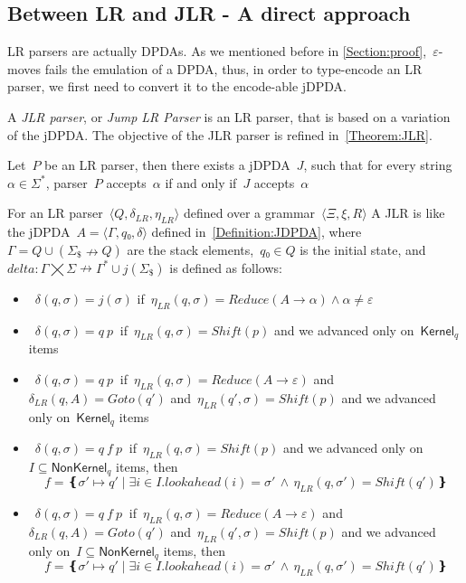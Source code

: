 \subsection{Between LR and JLR - A direct approach}
LR parsers are actually DPDAs\@. As we mentioned before in \cref{Section:proof},~$ε$-moves
  fails the emulation of a DPDA, thus, in order to type-encode an LR parser, we first need
  to convert it to the encode-able jDPDA\@.

A \emph{JLR parser}, or \emph{Jump LR Parser} is an LR parser, that
  is based on a variation of the jDPDA\@.
The objective of the JLR parser is refined in~\cref{Theorem:JLR}.

\begin{Theorem}
  \label{Theorem:JLR}
  Let~$P$ be an LR parser, then there exists a jDPDA~$J$,
  such that for every string~$α∈Σ^*$, parser~$P$ accepts~$α$
    if and only if~$J$ accepts~$α$
\end{Theorem}

For an LR parser~$⟨Q,δ_{LR}, η_{LR}⟩$ defined over a grammar~$⟨Ξ,ξ,R⟩$
A JLR is like the jDPDA~$A=⟨Γ,q₀,δ⟩$ defined in~\cref{Definition:JDPDA},
  where~$Γ= Q∪(Σ_\$↛Q)$ are the stack elements,~$q₀∈Q$
  is the initial state, and~$delta:Γ⨉Σ↛Γ^*∪j(Σ_\$)$ is defined as follows:
  \begin{itemize}
   \item~$δ(q,σ)= j(σ)$ if~$η_{LR}(q,σ)=Reduce(A→α)∧α≠ε$


   \item~$δ(q,σ)= q \: p~$ if~$η_{LR}(q,σ)=Shift(p)$ and we advanced only on~$\textsf{Kernel}_q$ items
   \item~$δ(q,σ)= q \: p~$ if~$η_{LR}(q,σ)=Reduce(A→ε)$
     and~$δ_{LR}(q,A)=Goto(q')$ and~$η_{LR}(q',σ)=Shift(p)$
     and we advanced only on~$\textsf{Kernel}_q$ items


   \item~$δ(q,σ)= q \: f \: p~$ if~$η_{LR}(q,σ)=Shift(p)$ and we advanced only on~$I⊆\textsf{NonKernel}_q$
     items, then
    \[
      f = ❴σ'↦q' \; | \;∃i∈I. lookahead(i)=σ' \,∧\, η_{LR}(q,σ')=Shift(q')❵
    \]

   \item~$δ(q,σ)= q \: f \: p~$ if~$η_{LR}(q,σ)=Reduce(A→ε)$
     and~$δ_{LR}(q,A)=Goto(q')$ and~$η_{LR}(q',σ)=Shift(p)$
     and we advanced only on~$I⊆\textsf{NonKernel}_q$
     items, then
     \[
      f = ❴σ'↦q' \; | \;∃i∈I. lookahead(i)=σ' \,∧\, η_{LR}(q,σ')=Shift(q')❵
     \]

  \end{itemize}
